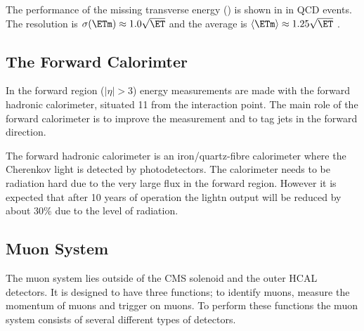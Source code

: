 The performance of the missing transverse energy (\ETm) is shown in
 in QCD events. The \ETm resolution is
$\sigma(\ETm) \approx 1.0 \sqrt \ET$ and the average \ETm is 
$\langle \ETm \rangle \approx 1.25 \sqrt \ET$ \cite{tdr}.

\subsection{The Forward Calorimter}
In the forward region ($|\eta| > 3$) energy measurements are made with the
forward hadronic calorimeter, situated \unit{11}{\meter} from the interaction
point. The main role of the forward calorimeter is to improve the \ETm
measurement and to tag jets in the forward direction.

The forward hadronic calorimeter is an iron/quartz-fibre calorimeter where the
Cherenkov light is detected by photodetectors.  The calorimeter needs to be
radiation hard due to the very large flux in the forward region. However it is
expected that after 10 years of operation the lightn output will be reduced by
about \unit{30}{\%} due to the level of radiation.

\subsection{Muon System}
The muon system lies outside of the CMS solenoid and the outer HCAL detectors.
It is designed to have three functions; to identify muons, measure the momentum
of muons and trigger on muons. To perform these functions the muon system
consists of several different types of detectors.

